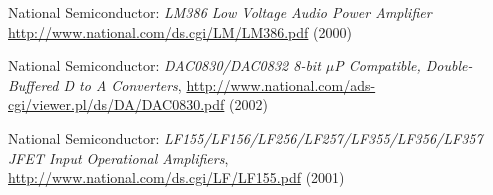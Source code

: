 \documentclass[10pt]{article}
\begin{document}
\pagebreak
\begin{thebibliography}{99}

National Semiconductor:
\emph{LM386 Low Voltage Audio Power Amplifier}
\url{http://www.national.com/ds.cgi/LM/LM386.pdf} (2000)

National Semiconductor:
\emph{DAC0830/DAC0832 8-bit $\mu$P Compatible, Double-Buffered D to A Converters}, 
\url{http://www.national.com/ads-cgi/viewer.pl/ds/DA/DAC0830.pdf} (2002)

National Semiconductor:
\emph{LF155/LF156/LF256/LF257/LF355/LF356/LF357 JFET Input Operational Amplifiers},
\url{http://www.national.com/ds.cgi/LF/LF155.pdf} (2001)

\end{thebibliography}

\fi %
\end{document}
